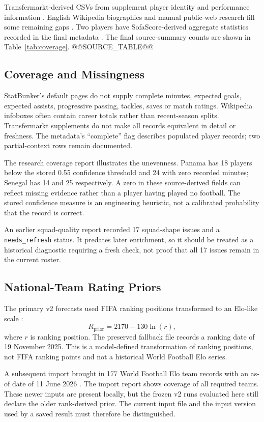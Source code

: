 Transfermarkt-derived CSVs from  supplement player
identity and performance information \cite{data-transfermarkt}. English Wikipedia
biographies and manual public-web research fill some remaining gaps
\cite{data-wikipedia}. Two players have SofaScore-derived aggregate statistics
recorded in the final metadata \cite{data-sofascore}. The final source-summary
counts are shown in Table~\ref{tab:coverage}.
\clearpage
@@SOURCE_TABLE@@
\subsection{Coverage and Missingness}
StatBunker's default pages do not supply complete minutes, expected goals,
expected assists, progressive passing, tackles, saves or match ratings. Wikipedia
infoboxes often contain career totals rather than recent-season splits.
Transfermarkt supplements do not make all records equivalent in detail or
freshness. The metadata's ``complete'' flag describes populated player records;
two partial-context rows remain documented.

The research coverage report illustrates the unevenness. Panama has 18 players
below the stored 0.55 confidence threshold and 24 with zero recorded minutes;
Senegal has 14 and 25 respectively. A zero in these source-derived fields can
reflect missing evidence rather than a player having played no football.
The stored confidence measure is an engineering heuristic, not a calibrated
probability that the record is correct.

An earlier squad-quality report recorded 17 squad-shape issues and a
\texttt{needs\_refresh} status. It predates later enrichment, so it should be
treated as a historical diagnostic requiring a fresh check, not proof that all
17 issues remain in the current roster.
\subsection{National-Team Rating Priors}
The primary v2 forecasts used FIFA ranking positions transformed to an
Elo-like scale \cite{data-fifa-ranking}:
\begin{equation}
R_{\mathrm{prior}}=2170-130\ln(r),
\end{equation}
where $r$ is ranking position. The preserved fallback file records a ranking
date of 19 November 2025. This is a model-defined transformation of ranking
positions, not FIFA ranking points and not a historical World Football Elo series.

A subsequent import brought in 177 World Football Elo team records with an
as-of date of 11 June 2026 \cite{data-elo}. The import report shows coverage of all
required teams. These newer inputs are present locally, but the frozen v2 runs
evaluated here still declare the older rank-derived prior. The current input
file and the input version used by a saved result must therefore be distinguished.
\clearpage
